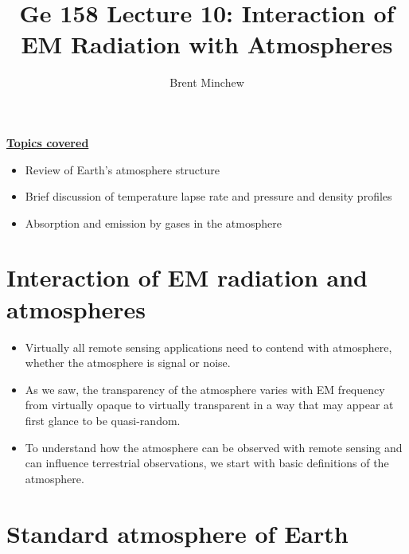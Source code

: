 \documentclass[11pt, oneside]{article}
\title{Ge 158 Lecture 10: Interaction of EM Radiation with Atmospheres}
\author{Brent Minchew}
\date{}
\begin{document}
\maketitle

\noindent\underline{\textbf{Topics covered}}
\begin{itemize}
	\item Review of Earth's atmosphere structure
	\item Brief discussion of temperature lapse rate and pressure and density profiles
	\item Absorption and emission by gases in the atmosphere
\end{itemize}

\section{Interaction of EM radiation and atmospheres}
\label{s:intro}

\begin{itemize}
	\item Virtually all remote sensing applications need to contend with atmosphere, whether the atmosphere is signal or noise.
	\item As we saw, the transparency of the atmosphere varies with EM frequency from virtually opaque to virtually transparent in a way that may appear at first glance to be quasi-random.
	\item To understand how the atmosphere can be observed with remote sensing and can influence terrestrial observations, we start with basic definitions of the atmosphere.
\end{itemize}

\section{Standard atmosphere of Earth}
\label{s:std}
\end{document}
